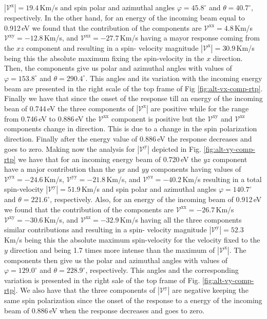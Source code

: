 \documentclass[prb,11pt,tightenlines,twocolumn,aps]{revtex4-1}
\begin{document}
% 
$|\mathcal{V}^{\mathrm{x}}|=19.4$\,Km/s 
% 
and spin polar and azimuthal angles $\varphi = 45.8^{\circ}$ and
$\theta=40.7^{\circ}$, respectively.
%
In the other hand, for an energy of the incoming beam equal to 0.912\,eV
we found that the contribution of the components are 
% 
$\mathcal{V}^{\mathrm{xx}}=   4.8$\,Km/s
$\mathcal{V}^{\mathrm{xy}}= -12.8$\,Km/s, and 
$\mathcal{V}^{\mathrm{xz}}= -27.7$\,Km/s
% 
having a mayor response coming from the $xz$ component and resulting in a spin-
velocity magnitude 
% 
$|\mathcal{V}^{\mathrm{x}}|=30.9$\,Km/s 
% 
being this the absolute maximum fixing the spin-velocity in the $x$ direction.
Then, the components give us polar and azimuthal angles with values of
$\varphi=153.8^{\circ}$ and $\theta=290.4^{\circ}$. This angles and its
variation with the incoming energy beam are presented in the right scale of the
top frame of Fig \ref{fig:alt-vx-comp-rtp}.
% 
Finally we have that since the onset of the response till an energy of the
incoming bean of 0.744\,eV the three components of $|\mathcal{V}^{\mathrm{x}}|$
are positive while for the range from 0.746\,eV to 0.886\,eV the
$\mathcal{V}^{\mathrm{xx}}$ component is positive but the
$\mathcal{V}^{\mathrm{xy}}$ and $\mathcal{V}^{\mathrm{xz}}$ components change in
direction. This is due to a change in the spin polarization direction. Finally
after the energy value of 0.886\,eV the response decreases and goes to zero.
Making now the analysis for $|\mathcal{V}^{\mathrm{y}}|$ depicted in Fig.
\ref{fig:alt-vy-comp-rtp} we have that for an incoming energy beam of 0.720\,eV
the $yz$ component have a major contribution than the $yx$ and $yy$ components
having values of
% 
$\mathcal{V}^{\mathrm{yx}}= -24.6$\,Km/s, 
$\mathcal{V}^{\mathrm{yy}}= -21.8$\,Km/s, and
$\mathcal{V}^{\mathrm{yz}}= -40.2$\,Km/s
%
resulting in a total spin-velocity
% 
$|\mathcal{V}^{\mathrm{y}}|=51.9$\,Km/s
%
and spin polar and azimuthal angles $\varphi=140.7^{\circ}$ and
$\theta=221.6^{\circ}$, respectively.
%
Also, for an energy of the incoming beam of 0.912\,eV we found that the
contribution of the components are
% 
$\mathcal{V}^{\mathrm{xx}}=-26.7$\,Km/s
$\mathcal{V}^{\mathrm{xy}}=-30.6$\,Km/s, and
$\mathcal{V}^{\mathrm{xz}}=-32.9$\,Km/s
% 
having all the three components similar contributions and resulting in a spin-
velocity magnitude $|\mathcal{V}^{\mathrm{y}}|=52.3$\,Km/s being this the
absolute maximum spin-velocity for the velocity fixed to the $y$ direction and
being 1.7 times more intense than the maximum of $|\mathcal{V}^{\mathrm{x}}|$.
The components then give us the polar and azimuthal angles with values of
$\varphi=129.0^{\circ}$ and $\theta=228.9^{\circ}$, respectively. This angles
and the corresponding variation is presented in the right sale of the top frame
of Fig. \ref{fig:alt-vy-comp-rtp}.
% 
We also have that the three components of $|\mathcal{V}^{\mathrm{y}}|$ are
negative keeping the same spin polarization since the onset of the response to a
energy of the incoming beam of 0.886\,eV when the response decreases and goes to
zero.
\end{document}
